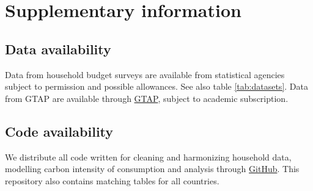 \documentclass[12pt, a4paper]{article}
\begin{document}
\begin{refsection}

\clearpage


\clearpage


\clearpage


\clearpage


\clearpage


\clearpage


\clearpage


\clearpage

\begin{refcontext}[sorting=nyt]
\printbibliography[heading=subbibliography, title ={References (Appendix)}]
\end{refcontext}
\end{refsection}

\clearpage

\section{Supplementary information}

\subsection{Data availability} \label{data_availability} Data from household budget surveys are available from statistical agencies subject to permission and possible allowances. See also table \ref{tab:datasets}. Data from GTAP are available through \href{https://www.gtap.agecon.purdue.edu/}{GTAP}, subject to academic subscription.  

\subsection{Code availability} \label{code}
We distribute all code written for cleaning and harmonizing household data, modelling carbon intensity of consumption and analysis through \href{https://github.com/lmissbach/Carbon-Intensity-2023}{GitHub}. This repository also contains matching tables for all countries.
\end{document}
